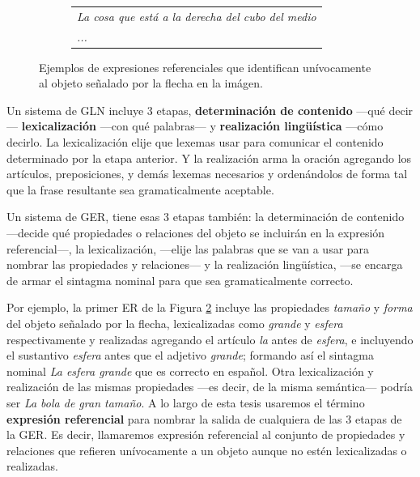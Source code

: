 \begin{figure}[H]
\begin{subfigure}{.5\textwidth}
\begin{tabular}{l}
 {\it La cosa que est\'a a la derecha del cubo del medio}\\

  {\it ...}
 \end{tabular}
\hspace*{-30cm}
\centering\caption{}\label{er-figura1}
\end{subfigure}
\begin{centering}
\caption{Ejemplos de expresiones referenciales que identifican un\'ivocamente al objeto se\~nalado por la flecha en la im\'agen.}
\label{figura-er}
\end{centering}
\end{figure}

Un sistema de GLN incluye 3 etapas, {\bf determinaci\'on de contenido} ---qu\'e decir--- {\bf lexicalizaci\'on} ---con qu\'e palabras--- y {\bf realizaci\'on ling\"{u}\'istica} ---c\'omo decirlo. La lexicalizaci\'on elije que lexemas usar para comunicar el contenido determinado por la etapa anterior. Y la realizaci\'on arma la oraci\'on agregando los art\'iculos, preposiciones, y dem\'as lexemas necesarios y orden\'andolos de forma tal que la frase resultante sea gramaticalmente aceptable. 

Un sistema de GER, tiene esas 3 etapas tambi\'en: la determinaci\'on de contenido ---decide qu\'e propiedades o relaciones del objeto se incluir\'an en la expresi\'on referencial---, la lexicalizaci\'on, ---elije las palabras que se van a usar para nombrar las propiedades y relaciones--- y la realizaci\'on ling\"u\'istica, ---se encarga de armar el sintagma nominal para que sea gramaticalmente correcto.

Por ejemplo, la primer ER de la Figura \ref{figura-er} incluye las propiedades {\it tama\~no} y {\it forma} del objeto se\~nalado por la flecha, lexicalizadas como {\it grande} y {\it esfera} respectivamente y realizadas agregando el art\'iculo {\it la} antes de {\it esfera}, e incluyendo el sustantivo {\it esfera} antes que el adjetivo {\it grande}; formando as\'i el sintagma nominal {\it La esfera grande} que es correcto en espa\~nol. Otra lexicalizaci\'on y realizaci\'on de las mismas propiedades ---es decir, de la misma sem\'antica--- podr\'ia ser {\it La bola de gran tama\~no}. A lo largo de esta tesis usaremos el t\'ermino {\bf expresi\'on referencial} para nombrar la salida de cualquiera de las 3 etapas de la GER. Es decir, llamaremos expresi\'on referencial al conjunto de propiedades y relaciones que refieren un\'ivocamente a un objeto aunque no est\'en lexicalizadas o realizadas.

